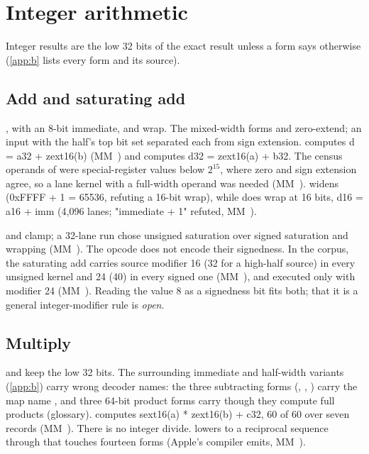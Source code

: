 \section{Integer arithmetic}\label{sec:integer-arithmetic}

Integer results are the low 32 bits of the exact result unless a form says otherwise (\cref{app:b} lists every form
and its source).

\subsection*{Add and saturating add}

,  with an 8-bit immediate,
 and  wrap. The mixed-width forms  and  zero-extend; an input
with the half's top bit set separated each from sign extension.  computes d = a32 + zext16(b)
(MM~) and  computes d32 = zext16(a) + b32. The census operands of  were special-register
values below $2^{15}$, where zero and sign extension agree, so a lane kernel with a full-width operand was needed
(MM~).  widens (0xFFFF + 1 = 65536, refuting a 16-bit wrap), while  does wrap at 16 bits,
d16 = a16 + imm (4,096 lanes; "immediate + 1" refuted, MM~).

 and  clamp; a 32-lane run chose unsigned
saturation over signed saturation and wrapping (MM~). The opcode does not encode their signedness. In the
corpus, the saturating add carries source modifier 16 (32 for a high-half source) in every unsigned kernel and 24 (40) in every signed one
(MM~), and  executed only with modifier 24 (MM~). Reading
the value 8 as a signedness bit fits both; that it is a general integer-modifier rule is \emph{open}.

\subsection*{Multiply}

 and  keep the low 32 bits. The surrounding immediate and
half-width variants (\cref{app:b}) carry wrong decoder names: the three subtracting
forms (, , ) carry the map name , and three 64-bit product forms carry  though they compute full products
(glossary).  computes sext16(a) * zext16(b) + c32, 60 of 60 over seven
records (MM~). There is no integer divide.  lowers to a reciprocal sequence through  that touches fourteen forms (Apple's compiler emits, MM~).

